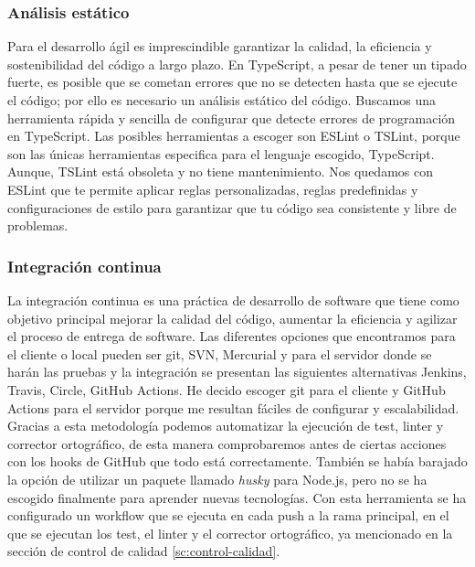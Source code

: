 \subsubsection*{Análisis estático}
Para el desarrollo ágil es imprescindible garantizar la calidad, la eficiencia y sostenibilidad del código a largo plazo.
En TypeScript, a pesar de tener un tipado fuerte, es posible que se cometan errores que no se detecten hasta que se ejecute el código; por ello es necesario un análisis estático del código.
Buscamos una herramienta rápida y sencilla de configurar que detecte errores de programación en TypeScript.
Las posibles herramientas a escoger son ESLint o TSLint, porque son las únicas herramientas especifica para el lenguaje escogido, TypeScript. Aunque, TSLint está obsoleta y no tiene mantenimiento.
Nos quedamos con ESLint que te permite aplicar reglas personalizadas, reglas predefinidas y configuraciones de estilo para garantizar que tu código sea consistente y libre de problemas.

\subsubsection*{Integración continua}
La integración continua es una práctica de desarrollo de software que tiene como objetivo principal mejorar la calidad del código, aumentar la eficiencia y agilizar el proceso de entrega de software.
Las diferentes opciones que encontramos para el cliente o local pueden ser git, SVN, Mercurial y para el servidor donde se harán las pruebas y la integración se presentan las siguientes
alternativas Jenkins, Travis, Circle, GitHub Actions. He decido escoger git para el cliente y GitHub Actions para el servidor porque me resultan fáciles de configurar y escalabilidad.
Gracias a esta metodología podemos automatizar la ejecución de test, linter y corrector ortográfico, de esta manera comprobaremos antes de ciertas acciones con los hooks de GitHub que todo está
correctamente. También se había barajado la opción de utilizar un paquete llamado \textit{husky} para Node.js, pero no se ha escogido finalmente para aprender nuevas tecnologías.
Con esta herramienta se ha configurado un workflow que se ejecuta en cada push a la rama principal, en el que se ejecutan los test, el linter y el corrector ortográfico, ya mencionado en la sección de control de calidad \ref{sc:control-calidad}.
